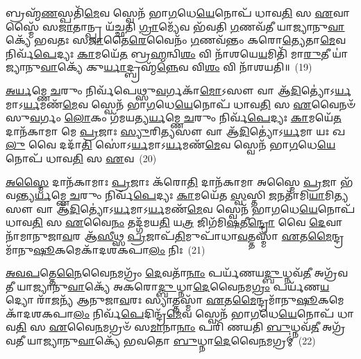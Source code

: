 𑌬𑍍𑌰𑌹𑍍𑌮᳴\-\ul{𑌣}\-𑌸𑍍𑌪𑌤𑌿᳴\-\ul{𑌮𑍇}\-𑌵 𑌸𑍍𑌵𑍇𑌨᳴ 𑌭𑌾\-\ul{𑌗}\-𑌧𑍇\-\ul{𑌯𑍇}\-𑌨𑍋𑌪᳴ 𑌧𑌾𑌵\-\ul{𑌤𑌿} 𑌸 \ul{𑌏}\-𑌵𑌾𑌸𑍍𑌮𑍈᳴ 𑌸\-\ul{𑌜𑌾}\-𑌤𑌾𑌨𑍍𑌪𑍍𑌰 𑌯᳴𑌚𑍍𑌛𑌤𑌿 \ul{𑌗𑍍𑌰𑌾}\-𑌮𑍍𑌯𑍇᳴𑌵 𑌭᳴𑌵𑌤𑌿 \ul{𑌗}\-𑌣𑌵᳴𑌤𑍀 𑌯𑌾𑌜𑍍𑌯𑌾𑌨𑍁\-\ul{𑌵𑌾}\-𑌕𑍍𑌯𑍇᳴ 𑌭𑌵𑌤𑌃 𑌸\-\ul{𑌜𑌾}\-𑌤𑍈\-\ul{𑌰𑍇}\-𑌵𑍈𑌨𑌂᳴ \ul{𑌗}\-𑌣𑌵᳴𑌨𑍍𑌤𑌂 𑌕𑌰𑍋\-\ul{𑌤𑍍𑌯𑍇}\-𑌤𑌾\-\ul{𑌮𑍇}\-𑌵 𑌨𑌿𑌰𑍍𑌵᳴\-\ul{𑌪𑍇}\-𑌦𑍍𑌯𑌃 \ul{𑌕𑌾}\-𑌮𑌯𑍇᳴\-\ul{𑌤} 𑌬𑍍𑌰\-\ul{𑌹𑍍𑌮}\-𑌨𑍍𑌵𑌿\-\ul{𑌶𑌂} 𑌵𑌿 𑌨𑌾᳴𑌶𑌯𑍇\-\ul{𑌯}\-𑌮𑌿𑌤𑌿᳴ 𑌮𑌾\-\ul{𑌰𑍁}\-𑌤𑍀 𑌯𑌾॑𑌜𑍍𑌯𑌾𑌨𑍁\-\ul{𑌵𑌾}\-𑌕𑍍𑌯𑍇᳴ 𑌕𑍁\-\ul{𑌰𑍍𑌯𑌾}\-𑌦𑍍𑌬𑍍𑌰𑌹𑍍𑌮᳴\-\ul{𑌨𑍍𑌨𑍇}\-𑌵 𑌵𑌿\-\ul{𑌶𑌂} 𑌵𑌿 𑌨𑌾᳴𑌶𑌯𑌤𑌿॥~(19)

{\anuvakamend[{𑌤𑍇𑌜𑌃᳴ \ul{𑌸}\-𑌮𑍀𑌚𑍀॑ 𑌬𑍍𑌰𑌹𑍍𑌮𑌵\-\ul{𑌰𑍍𑌚}\-𑌸𑍍𑌯𑍇᳴𑌵 𑌗𑍍𑌰𑌾𑌮᳴𑌕𑌾\-\ul{𑌮}\-𑌸𑍍𑌤𑍍𑌰𑌿𑌚᳴𑌤𑍍𑌵𑌾𑌰𑌿𑍞𑌶𑌚𑍍𑌚}]}%

\-\ul{𑌅}\-\-\ul{𑌰𑍍𑌯}\-𑌮𑍍𑌣𑍇 \ul{𑌚}\-𑌰𑍁𑌂 𑌨𑌿𑌰𑍍𑌵᳴𑌪𑍇𑌥𑍍𑌸𑍁\-\ul{𑌵}\-𑌰𑍍𑌗𑌕𑌾᳴\-\ul{𑌮𑍋}\-\-𑌽𑌸𑍗 𑌵𑌾 𑌆᳴\-\ul{𑌦𑌿}\-𑌤𑍍𑌯𑍋॑\-𑌽\-\ul{𑌰𑍍𑌯}\-𑌮𑌾\-𑌽\-\ul{𑌰𑍍𑌯}\-𑌮𑌣᳴\-\ul{𑌮𑍇}\-𑌵 𑌸𑍍𑌵𑍇𑌨᳴ 𑌭𑌾\-\ul{𑌗}\-𑌧𑍇\-\ul{𑌯𑍇}\-𑌨𑍋𑌪᳴ 𑌧𑌾𑌵\-\ul{𑌤𑌿} 𑌸 \ul{𑌏}\-𑌵𑍈𑌨𑍞᳴ 𑌸𑍁\-\ul{𑌵}\-𑌰𑍍𑌗𑌂 \ul{𑌲𑍋}\-𑌕𑌂 𑌗᳴𑌮𑌯𑌤𑍍𑌯\-\ul{𑌰𑍍𑌯}\-𑌮𑍍𑌣𑍇 \ul{𑌚}\-𑌰𑍁𑌂 𑌨𑌿𑌰𑍍𑌵᳴\-\ul{𑌪𑍇}\-𑌦𑍍𑌯𑌃 \ul{𑌕𑌾}\-𑌮𑌯𑍇᳴\-\ul{𑌤} 𑌦𑌾𑌨᳴𑌕𑌾𑌮𑌾 𑌮𑍇 \ul{𑌪𑍍𑌰}\-𑌜𑌾𑌃 \ul{𑌸𑍍𑌯𑍁}\-𑌰𑌿\-\ul{𑌤𑍍𑌯}\-𑌸𑍗 𑌵𑌾 𑌆᳴\-\ul{𑌦𑌿}\-𑌤𑍍𑌯𑍋॑\-𑌽\-\ul{𑌰𑍍𑌯}\-𑌮𑌾 𑌯𑌃 𑌖\-\ul{𑌲𑍁} 𑌵𑍈 𑌦𑌦𑌾᳴\-\ul{𑌤𑌿} 𑌸𑍋॑\-𑌽\-\ul{𑌰𑍍𑌯}\-𑌮𑌾\-𑌽\-\ul{𑌰𑍍𑌯}\-𑌮𑌣᳴\-\ul{𑌮𑍇}\-𑌵 𑌸𑍍𑌵𑍇𑌨᳴ 𑌭𑌾\-\ul{𑌗}\-𑌧𑍇\-\ul{𑌯𑍇}\-𑌨𑍋𑌪᳴ 𑌧𑌾𑌵\-\ul{𑌤𑌿} 𑌸 \ul{𑌏}\-𑌵~(20)

\-\ul{𑌅}\-\-\ul{𑌸𑍍𑌮𑍈} 𑌦𑌾𑌨᳴𑌕𑌾𑌮𑌾𑌃 \ul{𑌪𑍍𑌰}\-𑌜𑌾𑌃 𑌕᳴𑌰𑍋\-\ul{𑌤𑌿} 𑌦𑌾𑌨᳴𑌕𑌾𑌮𑌾 𑌅𑌸𑍍𑌮𑍈 \ul{𑌪𑍍𑌰}\-𑌜𑌾 𑌭᳴𑌵𑌨𑍍𑌤𑍍𑌯\-\ul{𑌰𑍍𑌯}\-𑌮𑍍𑌣𑍇 \ul{𑌚}\-𑌰𑍁𑌂 𑌨𑌿𑌰𑍍𑌵᳴\-\ul{𑌪𑍇}\-𑌦𑍍𑌯𑌃 \ul{𑌕𑌾}\-𑌮𑌯𑍇᳴𑌤 \ul{𑌸𑍍𑌵}\-𑌸𑍍𑌤𑌿 \ul{𑌜}\-𑌨𑌤𑌾᳴𑌮𑌿\-\ul{𑌯𑌾}\-𑌮𑌿\-\ul{𑌤𑍍𑌯}\-𑌸𑍗 𑌵𑌾 𑌆᳴\-\ul{𑌦𑌿}\-𑌤𑍍𑌯𑍋॑\-𑌽\-\ul{𑌰𑍍𑌯}\-𑌮𑌾\-𑌽\-\ul{𑌰𑍍𑌯}\-𑌮𑌣᳴\-\ul{𑌮𑍇}\-𑌵 𑌸𑍍𑌵𑍇𑌨᳴ 𑌭𑌾\-\ul{𑌗}\-𑌧𑍇\-\ul{𑌯𑍇}\-𑌨𑍋𑌪᳴ 𑌧𑌾𑌵\-\ul{𑌤𑌿} 𑌸 \ul{𑌏}\-𑌵𑍈\-\ul{𑌨𑌂} 𑌤𑌦𑍍𑌗᳴𑌮𑌯\-\ul{𑌤𑌿} 𑌯\-\ul{𑌤𑍍𑌰} 𑌜𑌿𑌗᳴𑌮𑌿\-\ul{𑌷}\-𑌤𑍀\-\ul{𑌨𑍍𑌦𑍍𑌰𑍋} 𑌵𑍈 \ul{𑌦𑍇}\-𑌵𑌾𑌨𑌾᳴𑌮𑌾𑌨𑍁𑌜𑌾\-\ul{𑌵}\-𑌰 𑌆᳴\-\ul{𑌸𑍀}\-𑌥𑍍𑌸 \ul{𑌪𑍍𑌰}\-𑌜𑌾𑌪᳴\-\ul{𑌤𑌿}\-𑌮𑍁𑌪𑌾᳴𑌧𑌾\-\ul{𑌵}\-𑌤𑍍𑌤𑌸𑍍𑌮𑌾᳴ \ul{𑌏}\-𑌤\-\ul{𑌮𑍈}\-𑌨𑍍𑌦𑍍𑌰𑌮𑌾᳴𑌨𑍁\-\ul{𑌷𑍂}\-𑌕𑌮𑍇𑌕𑌾᳴\-𑌦𑌶\-𑌕𑌪𑌾\-\ul{𑌲𑌂} 𑌨𑌿𑌃~(21)

\-\ul{𑌅}\-\-\ul{𑌵}\-\-\ul{𑌪}\-𑌤𑍍𑌤𑍇\-\ul{𑌨𑍈}\-𑌵𑍈\-\ul{𑌨}\-𑌮𑌗𑍍𑌰𑌂᳴ \ul{𑌦𑍇}\-𑌵𑌤𑌾᳴\-\ul{𑌨𑌾𑌂} 𑌪𑌰𑍍𑌯᳴𑌣𑌯\-\ul{𑌦𑍍𑌬𑍁}\-𑌧𑍍𑌨𑌵᳴\-\ul{𑌤𑍀} 𑌅𑌗𑍍𑌰᳴𑌵𑌤𑍀 𑌯𑌾𑌜𑍍𑌯𑌾𑌨𑍁\-\ul{𑌵𑌾}\-𑌕𑍍𑌯𑍇᳴ 𑌅𑌕𑌰𑍋\-\ul{𑌦𑍍𑌬𑍁}\-𑌧𑍍𑌨𑌾\-\ul{𑌦𑍇}\-𑌵𑍈\-\ul{𑌨}\-𑌮\-\ul{𑌗𑍍𑌰𑌂} 𑌪𑌰𑍍𑌯᳴𑌣\-\ul{𑌯}\-𑌦𑍍𑌯𑍋 𑌰𑌾᳴\-\ul{𑌜}\-𑌨𑍍𑌯᳴ 𑌆𑌨𑍁𑌜𑌾\-\ul{𑌵}\-𑌰𑌃 𑌸𑍍𑌯𑌾𑌤𑍍𑌤𑌸𑍍𑌮𑌾᳴ \ul{𑌏}\-𑌤\-\ul{𑌮𑍈}\-𑌨𑍍𑌦𑍍𑌰𑌮𑌾᳴𑌨𑍁\-\ul{𑌷𑍂}\-𑌕𑌮𑍇𑌕𑌾᳴\-𑌦𑌶\-𑌕𑌪𑌾\-\ul{𑌲𑌂} 𑌨𑌿𑌰𑍍𑌵᳴\-\ul{𑌪𑍇}\-𑌦𑌿𑌨𑍍𑌦𑍍𑌰᳴\-\ul{𑌮𑍇}\-𑌵 𑌸𑍍𑌵𑍇𑌨᳴ 𑌭𑌾\-\ul{𑌗}\-𑌧𑍇\-\ul{𑌯𑍇}\-𑌨𑍋𑌪᳴ 𑌧𑌾𑌵\-\ul{𑌤𑌿} 𑌸 \ul{𑌏}\-𑌵𑍈\-\ul{𑌨}\-𑌮𑌗𑍍𑌰𑍞᳴ 𑌸\-\ul{𑌮𑌾}\-𑌨𑌾\-\ul{𑌨𑌾𑌂} 𑌪𑌰𑌿᳴ 𑌣𑌯𑌤𑌿 \ul{𑌬𑍁}\-𑌧𑍍𑌨𑌵᳴\-\ul{𑌤𑍀} 𑌅𑌗𑍍𑌰᳴𑌵𑌤𑍀 𑌯𑌾𑌜𑍍𑌯𑌾𑌨𑍁\-\ul{𑌵𑌾}\-𑌕𑍍𑌯𑍇᳴ 𑌭𑌵𑌤𑍋 \ul{𑌬𑍁}\-𑌧𑍍𑌨𑌾\-\ul{𑌦𑍇}\-𑌵𑍈\-\ul{𑌨}\-𑌮𑌗𑍍𑌰𑌮𑍍॑~(22)

